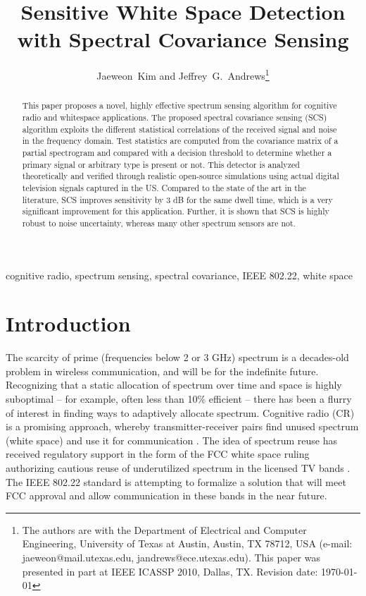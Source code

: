 \documentclass[draftclsnofoot,onecolumn,12pt]{IEEEtran}
\begin{document}
\title{Sensitive White Space Detection with Spectral Covariance Sensing}

\author{{\large Jaeweon~Kim and Jeffrey~G.~Andrews}\thanks{The authors are with the Department of Electrical and Computer Engineering,
University of Texas at Austin,
Austin, TX 78712, USA
(e-mail: jaeweon@mail.utexas.edu, jandrews@ece.utexas.edu).
This paper was presented in part at IEEE ICASSP 2010, Dallas, TX.  Revision date: \today
}}
\maketitle

\begin{abstract}
This paper proposes a novel, highly effective spectrum sensing algorithm for cognitive radio and whitespace applications.
The proposed spectral covariance sensing (SCS) algorithm exploits the different statistical correlations of the received signal and noise
in the frequency domain. Test statistics are computed from the covariance matrix of a partial spectrogram and compared with a decision threshold
to determine whether a primary signal or arbitrary type is present or not.  This detector is analyzed theoretically and
verified through realistic open-source simulations using actual digital television signals captured in the US. Compared to the state of the art in the literature, SCS improves sensitivity by 3 dB for the same dwell time, which is a very significant improvement for this application.
Further, it is shown that SCS is highly robust to noise uncertainty, whereas many other spectrum sensors are not.

\end{abstract}
\begin{keywords}
cognitive radio, spectrum sensing, spectral covariance, IEEE 802.22, white space
\end{keywords}

\section{Introduction}
\label{sec:intro} 
The scarcity of prime (frequencies below 2 or 3 GHz) spectrum is a decades-old problem in wireless communication, and will be for the indefinite future.  Recognizing that a static allocation of spectrum over time and space is highly suboptimal -- for example, often less than 10\% efficient \cite{CabMis04, CorGho07, BroWol04} -- there has been a flurry of interest in finding ways to adaptively allocate spectrum.  Cognitive radio (CR) is a promising approach, whereby transmitter-receiver pairs find unused spectrum (white space) and use it for communication
 \cite{Hoven:thesis,GeiTon07,ZenLia09}.  The idea of spectrum reuse has received regulatory support in the form of the FCC white space ruling authorizing cautious reuse of underutilized spectrum in the licensed TV bands \cite{FCC08-260}.  The IEEE 802.22 standard \cite{802.22/D1.0_2008, SteCho09} is attempting to formalize a solution that will meet FCC approval and allow communication in these bands in the near future.
 
\end{document}
